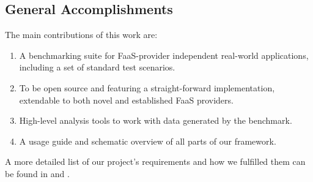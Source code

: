 \documentclass[../main.tex]{subfiles}
\begin{document}
\subsection{General Accomplishments}%
\label{sub:introAccomplishments}

The main contributions of this work are:
\begin{enumerate}
  \item A benchmarking suite for FaaS-provider independent real-world applications, including a set of standard test scenarios.
  \item To be open source and featuring a straight-forward implementation, extendable to both novel and established FaaS providers.
  \item High-level analysis tools to work with data generated by the benchmark. 
  \item A usage guide and schematic overview of all parts of our framework.
\end{enumerate}
A more detailed list of our project's requirements and how we fulfilled them 
can be found in  and .
\end{document}
